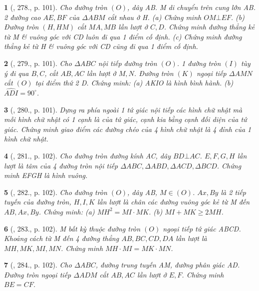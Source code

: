 \documentclass{article}
\newtheorem{baitoan}{}
\begin{document}
\begin{baitoan}[\cite{Binh_Toan_9_tap_2}, 278., p. 101]
	Cho đường tròn $(O)$, dây AB. M di chuyển trên cung lớn AB. 2 đường cao $AE,BF$ của $\Delta ABM$ cắt nhau ở H. (a) Chứng minh $OM\bot EF$. (b) Đường tròn $(H,HM)$ cắt $MA,MB$ lần lượt ở $C,D$. Chứng minh đường thẳng kẻ từ M \& vuông góc với CD luôn đi qua 1 điểm cố định. (c) Chứng minh đường thẳng kẻ từ H \& vuông góc với CD cũng đi qua 1 điểm cố định.
\end{baitoan}

\begin{baitoan}[\cite{Binh_Toan_9_tap_2}, 279., p. 101]
	Cho $\Delta ABC$ nội tiếp đường tròn $(O)$. 1 đường tròn $(I)$ tùy ý đi qua $B,C$, cắt $AB,AC$ lần lượt ở $M,N$. Đường tròn $(K)$ ngoại tiếp $\Delta AMN$ cắt $(O)$ tại điểm thứ 2 D. Chứng minh: (a) AKIO là hình bình hành. (b) $\widehat{ADI} = 90^\circ$. 
\end{baitoan}

\begin{baitoan}[\cite{Binh_Toan_9_tap_2}, 280., p. 101]
	Dựng ra phía ngoài 1 tứ giác nội tiếp các hình chữ nhật mà mỗi hình chữ nhật có 1 cạnh là của tứ giác, cạnh kia bằng cạnh đối diện của tứ giác. Chứng minh giao điểm các đường chéo của 4 hình chữ nhật là 4 đỉnh của 1 hình chữ nhật.
\end{baitoan}

\begin{baitoan}[\cite{Binh_Toan_9_tap_2}, 281., p. 102]
	Cho đường tròn đường kính AC, dây $BD\bot AC$. $E,F,G,H$ lần lượt là tâm của 4 đường tròn nội tiếp $\Delta ABC,\Delta ABD,\Delta ACD,\Delta BCD$. Chứng minh EFGH là hình vuông.
\end{baitoan}

\begin{baitoan}[\cite{Binh_Toan_9_tap_2}, 282., p. 102]
	Cho đường tròn $(O)$, dây AB, $M\in(O)$. $Ax,By$ là 2 tiếp tuyến của đường tròn, $H,I,K$ lần lượt là chân các đường vuông góc kẻ từ M đến $AB,Ax,By$. Chứng minh: (a) $MH^2 = MI\cdot MK$. (b) $MI + MK\ge2MH$.
\end{baitoan}

\begin{baitoan}[\cite{Binh_Toan_9_tap_2}, 283., p. 102]
	M bất kỳ thuộc đường tròn $(O)$ ngoại tiếp tứ giác ABCD. Khoảng cách từ M đến 4 đường thẳng $AB,BC,CD,DA$ lần lượt là $MH,MK,MI,MN$. Chứng minh $MH\cdot MI = MK\cdot MN$.
\end{baitoan}

\begin{baitoan}[\cite{Binh_Toan_9_tap_2}, 284., p. 102]
	Cho $\Delta ABC$, đường trung tuyến AM, đường phân giác AD. Đường tròn ngoại tiếp $\Delta ADM$ cắt $AB,AC$ lần lượt ở $E,F$. Chứng minh $BE = CF$.
\end{baitoan}
\end{document}
